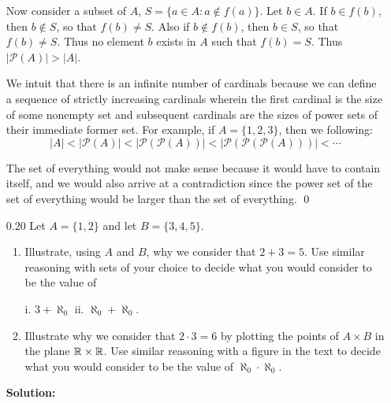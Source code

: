\begin{enumerate}
      Now consider a subset of $A$, $S = \{a \in A : a \notin f(a)\}$. Let
      $b \in A$. If $b \in f(b)$, then $b \notin S$, so that $f(b) \neq S$. Also
      if $b \notin f(b)$, then $b \in S$, so that $f(b) \neq S$. Thus no element
      $b$ exists in $A$ such that $f(b) = S$. Thus $|\mathscr{P}(A)| > |A|$.
      
      We intuit that there is an infinite number of cardinals because we can
      define a sequence of strictly increasing cardinals wherein the first
      cardinal is the size of some nonempty set and subsequent cardinals are
      the sizes of power sets of their immediate former set. For example, if
      $A = \{1, 2, 3\}$, then we following:
      $$|A| < |\mathscr{P}(A)| < |\mathscr{P}(\mathscr{P}(A))| <
        |\mathscr{P}(\mathscr{P}(\mathscr{P}(A)))| < \cdots$$
        
      The set of everything would not make sense because it would have to
      contain itself, and we would also arrive at a contradiction since the
      power set of the set of everything would be larger than the set of
      everything. \qed
   \item[0.20] Let $A = \{1, 2\}$ and let $B = \{3, 4, 5\}$.
      \begin{enumerate}
         \item Illustrate, using $A$ and $B$, why we consider that $2 + 3 = 5$.
               Use similar reasoning with sets of your choice to decide what you
               would consider to be the value of

               i. $3 + \aleph_0$
               \qquad\qquad\qquad\qquad\qquad\qquad\qquad\qquad\qquad\qquad
               ii. $\aleph_0 + \aleph_0$.
         \item Illustrate why we consider that $2 \cdot 3 = 6$ by plotting the
               points of $A \times B$ in the plane $\mathbb{R} \times \mathbb{R}$. Use similar
               reasoning with a figure in the text to decide what you would
               consider to be the value of $\aleph_0 \cdot \aleph_0$.
      \end{enumerate}

      \textbf{Solution:} 


\end{enumerate}
